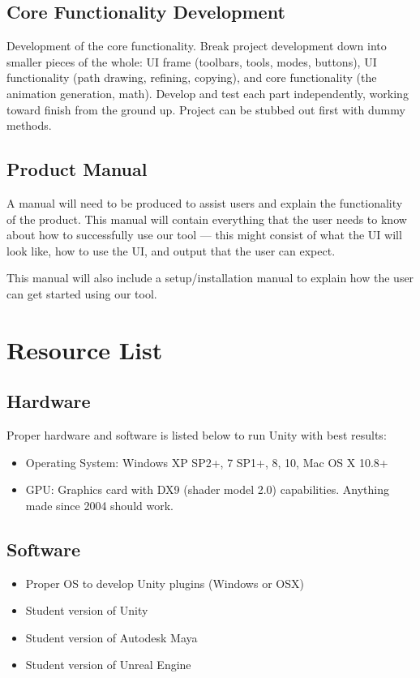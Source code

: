 \documentclass[12pt]{article}
\begin{document}
\subsection{Core Functionality Development}
Development of the core functionality. Break project development down into smaller pieces of the whole: UI frame (toolbars, tools, modes, buttons), UI functionality (path drawing, refining, copying), and core functionality (the animation generation, math). Develop and test each part independently, working toward finish from the ground up. Project can be stubbed out first with dummy methods.

\subsection{Product Manual}
A manual will need to be produced to assist users and explain the functionality of the product. This manual will contain everything that the user needs to know about how to successfully use our tool --- this might consist of what the UI will look like, how to use the UI, and output that the user can expect. 

This manual will also include a setup/installation manual to explain how the user can get started using our tool.

\section{Resource List}
\label{sec:resource}
\subsection{Hardware}
Proper hardware and software is listed below to run Unity with best results:
\begin{itemize}
 \item Operating System: Windows XP SP2+, 7 SP1+, 8, 10, Mac OS X 10.8+
 \item GPU: Graphics card with DX9 (shader model 2.0) capabilities. Anything made since 2004 should work.
\end{itemize}

\subsection{Software}
\begin{itemize}
 \item Proper OS to develop Unity plugins (Windows or OSX)
 \item Student version of Unity
 \item Student version of Autodesk Maya
 \item Student version of Unreal Engine
\end{itemize}
\end{document}
